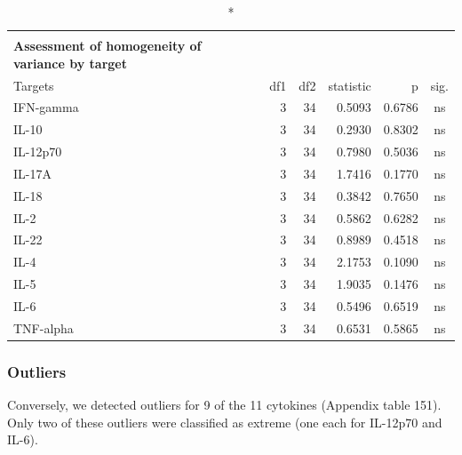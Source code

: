 \documentclass[
  12pt,
  letterpaper,
]{article}
\begin{document}
\begingroup
\fontsize{12.0pt}{14.4pt}\selectfont
\begin{longtable}{l|rrrrc}
\caption*{
{\large \textbf{Appendix Table 150}} \\ 
{\small \textbf{Assessment of homogeneity of variance by target}}
} \\ 
\toprule
Targets & {df1} & {df2} & {statistic} & {p} & {sig.} \\ 
\midrule\addlinespace[2.5pt]
IFN-gamma & 3 & 34 & 0.5093 & 0.6786 & ns \\ 
IL-10 & 3 & 34 & 0.2930 & 0.8302 & ns \\ 
IL-12p70 & 3 & 34 & 0.7980 & 0.5036 & ns \\ 
IL-17A & 3 & 34 & 1.7416 & 0.1770 & ns \\ 
IL-18 & 3 & 34 & 0.3842 & 0.7650 & ns \\ 
IL-2 & 3 & 34 & 0.5862 & 0.6282 & ns \\ 
IL-22 & 3 & 34 & 0.8989 & 0.4518 & ns \\ 
IL-4 & 3 & 34 & 2.1753 & 0.1090 & ns \\ 
IL-5 & 3 & 34 & 1.9035 & 0.1476 & ns \\ 
IL-6 & 3 & 34 & 0.5496 & 0.6519 & ns \\ 
TNF-alpha & 3 & 34 & 0.6531 & 0.5865 & ns \\ 
\bottomrule
\end{longtable}
\endgroup

\subsubsection{Outliers}\label{outliers-5}

Conversely, we detected outliers for 9 of the 11 cytokines (Appendix table 151). Only two of these outliers were classified as extreme (one each for IL-12p70 and IL-6).
\end{document}
